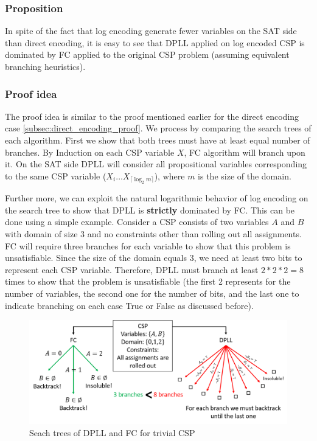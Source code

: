 \subsubsection{Proposition}\label{subsec:log_proposition}
In spite of the fact that log encoding generate fewer variables on the SAT side than direct encoding, it is easy to see that DPLL applied on log encoded CSP is dominated by FC applied to the original CSP problem (assuming equivalent branching heuristics).

\subsubsection{Proof idea}
The proof idea is similar to the proof mentioned earlier for the direct encoding case \ref{subsec:direct_encoding_proof}. We process by comparing the search trees of each algorithm. First we show that both trees must have at least equal number of branches. By Induction on each CSP variable $X$, FC algorithm will branch upon it. On the SAT side DPLL will consider all propositional variables corresponding to the same CSP variable ($X_i \dots X_{\lceil \log_2 m \rceil}$), where $m$ is the size of the domain.

Further more, we can exploit the natural logarithmic behavior of log encoding on the search tree to show that DPLL is \textbf{strictly} dominated by FC. This can be done using a simple example. Consider a CSP consists of two variables $A$ and $B$ with domain of size 3 and no constraints other than rolling out all assignments. FC will require three branches for each variable to show that this problem is unsatisfiable. Since the size of the domain equals 3, we need at least two bits to represent each CSP variable. Therefore, DPLL must branch at least $2 * 2 * 2 = 8$ times to show that the problem is unsatisfiable (the first 2 represents for the number of variables, the second one for the number of bits, and the last one to indicate branching on each case True or False as discussed before).

\begin{figure}[H]
	\centering
	\includegraphics[width=0.85\linewidth]{assets/log_dominated_by_fc}
	\captionsetup{justification=centering,margin=2cm}
	\caption{Seach trees of DPLL and FC for trivial CSP}
	\label{fig:log_dominated_by_fc}
\end{figure}



